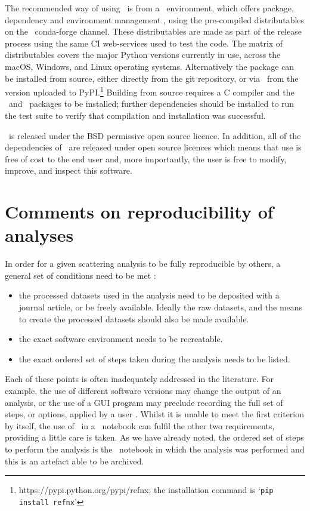 \documentclass[pdf,preprint]{article}
\begin{document}
The recommended way of using \ is from a \conda\ environment, which offers package, dependency and environment management \cite{conda}, using the pre-compiled distributables on the \ conda-forge channel. These distributables are made as part of the release process using the same CI web-services used to test the code. The matrix of distributables covers the major Python versions currently in use, across the macOS, Windows, and Linux operating systems. Alternatively the package can be installed from source, either directly from the git repository, or via \pip\ from the version uploaded to PyPI.\footnote{https://pypi.python.org/pypi/refnx; the installation command is `\texttt{pip install refnx}'} Building from source requires a C compiler and the \Cython\ and \NumPy\ packages to be installed; further dependencies should be installed to run the test suite to verify that compilation and installation was successful.

\ is released under the BSD permissive open source licence. In addition, all of the  dependencies of \ are released under open source licences which means that use is free of cost to the end user and, more importantly, the user is free to modify, improve, and inspect this software.

\section{Comments on reproducibility of analyses}

In order for a given scattering analysis to be fully reproducible by others, a general set of conditions need to be met \cite{Helliwell2017, Moeller2017a}:
\begin{itemize}
  \item the processed datasets used in the analysis need to be deposited with a journal article, or be freely available. Ideally the raw datasets, and the means to create the processed datasets should also be made available.
  \item the exact software environment needs to be recreatable.
  \item the exact ordered set of steps taken during the analysis needs to be listed.
\end{itemize} 
Each of these points is often inadequately addressed in the literature. For example, the use of different software versions may change the output of an analysis, or the use of a GUI program may preclude recording the full set of steps, or options, applied by a user \cite{Chirigati2013}. Whilst it is unable to meet the first criterion by itself, the use of \ in a \Jupyter\ notebook can fulfil the other two requirements, providing a little care is taken. As we have already noted, the ordered set of steps to perform the analysis is the \Jupyter\ notebook in which the analysis was performed and this is an artefact able to be archived.
\end{document}
